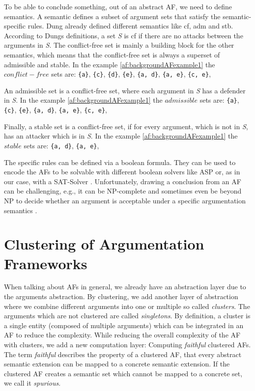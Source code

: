 To be able to conclude something, out of an abstract AF, we need to define semantics. A semantic defines a subset of argument sets that satisfy the semantic-specific rules. Dung already defined different semantics \cite{Dung1995-DUNOTA-2} like \ac{cf}, \ac{adm} and \ac{stb}. According to Dungs definitions, a set \textit{S} is \ac{cf} if there are no attacks between the arguments in \textit{S}. The conflict-free set is mainly a building block for the other semantics, which means that the conflict-free set is always a superset of admissible and stable. In the example \ref{af:backgroundAFexample1} the $conflict-free$ sets are:
\texttt{\{a\}},
\texttt{\{c\}},
\texttt{\{d\}},
\texttt{\{e\}},
\texttt{\{a, d\}},
\texttt{\{a, e\}},
\texttt{\{c, e\}},


An admissible set is a conflict-free set, where each argument in \textit{S} has a defender in \textit{S}. In the example \ref{af:backgroundAFexample1} the $admissible$ sets are:
\texttt{\{a\}},
\texttt{\{c\}},
\texttt{\{e\}},
\texttt{\{a, d\}},
\texttt{\{a, e\}},
\texttt{\{c, e\}},

Finally, a stable set is a conflict-free set, if for every argument, which is not in \textit{S}, has an attacker which is in \textit{S}. In the example \ref{af:backgroundAFexample1} the $stable$ sets are:
\texttt{\{a, d\}},
\texttt{\{a, e\}},


The specific rules can be defined via a boolean formula. They can be used to encode the \acp{AF} to be solvable with different boolean solvers like \ac{ASP} \cite{DBLP:journals/corr/abs-1301-1388} or, as in our case, with a \ac{SAT-Solver} \cite{DBLP:journals/amai/AmgoudD13}. Unfortunately, drawing a conclusion from an AF can be challenging, e.g., it can be NP-complete and sometimes even be beyond NP to decide whether an argument is acceptable under a specific argumentation semantics \cite{DBLP:journals/ai/DvorakGRW23}.



\section{Clustering of Argumentation Frameworks}

When talking about AFs in general, we already have an abstraction layer due to the arguments abstraction. By clustering, we add another layer of abstraction where we combine different arguments into one or multiple so called \textit{clusters}. The arguments which are not clustered are called \textit{singletons}.
By definition, a cluster is a single entity (composed of multiple arguments) which can be integrated in an AF to reduce the complexity. While reducing the overall complexity of the AF with clusters, we add a new computation layer: Computing \textit{faithful} clustered AFs. The term \textit{faithful} describes the property of a clustered AF, that every abstract semantic extension can be mapped to a concrete semantic extension. If the clustered AF creates a semantic set which cannot be mapped to a concrete set, we call it \textit{spurious}. 

